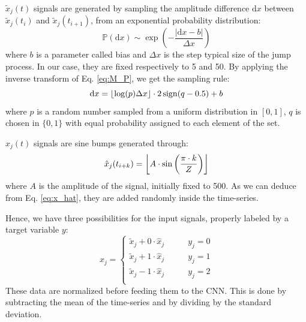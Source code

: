 \documentclass[prl,twocolumn]{revtex4-1}
\DeclarePairedDelimiter\floor{\lfloor}{\rfloor}
\begin{document}
$\tilde{x}_j(t)$ signals are generated by sampling the amplitude difference $\mathrm{d}x$ between $\tilde{x}_j(t_{i})$ and $\tilde{x}_j(t_{i+1})$, from an exponential probability distribution:
\begin{equation}
    \mathbb{P}(\mathrm{d}x) \sim \operatorname{exp}\left(-\frac{|\mathrm{d}x - b|}{\Delta x}\right)
    \label{eq:M_P}
\end{equation}
where $b$ is a parameter called bias and $\Delta x$ is the step typical size of the jump process. In our case, they are fixed respectively to 5 and 50. By applying the inverse transform of Eq. \ref{eq:M_P}, we get the sampling rule:
\begin{equation}
    \mathrm{d}x = \floor*{\log(p) \Delta x} \cdot 2 \operatorname{sign}(q - 0.5) + b
    \label{eq:M_DX}
\end{equation}
where $p$ is a random number sampled from a uniform distribution in $[0,1]$,  $q$ is chosen in $\{0,1\}$ with equal probability assigned to each element of the set.

$\hat{x}_j(t)$ signals are sine bumps generated through:
\begin{equation}
    \hat{x}_j(t_{i+k}) = \floor*{A \cdot \sin\left( \frac{\pi \cdot k}{Z} \right)}
    \label{eq:M_DX}
\end{equation}
where $A$ is the amplitude of the signal, initially fixed to 500. As we can deduce from Eq. \ref{eq:x_hat}, they are added randomly inside the time-series.

Hence, we have three possibilities for the input signals, properly labeled by a target variable $y$:
\begin{equation}
    x_j = 
    \begin{cases}
        \tilde{x}_j + 0 \cdot \hat{x}_j     &\qquad   y_j=0     \\
        \tilde{x}_j + 1 \cdot \hat{x}_j     &\qquad   y_j=1     \\
        \tilde{x}_j - 1 \cdot \hat{x}_j     &\qquad   y_j=2     \\
    \end{cases}
    \label{eq:M_X}
\end{equation}
These data are normalized before feeding them to the CNN. This is done by subtracting the mean of the time-series and by dividing by the standard deviation.
\end{document}
